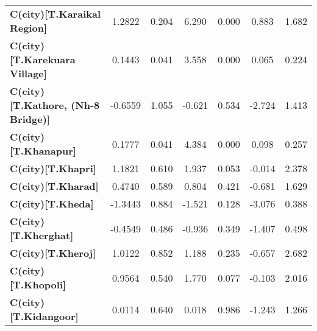 \begin{center}
\begin{tabular}{lcccccc}
\textbf{C(city)[T.Karaikal Region]}                                                                 &       1.2822  &        0.204     &     6.290  &         0.000        &        0.883    &        1.682     \\
\textbf{C(city)[T.Karekuara Village]}                                                               &       0.1443  &        0.041     &     3.558  &         0.000        &        0.065    &        0.224     \\
\textbf{C(city)[T.Kathore, (Nh-8 Bridge)]}                                                          &      -0.6559  &        1.055     &    -0.621  &         0.534        &       -2.724    &        1.413     \\
\textbf{C(city)[T.Khanapur]}                                                                        &       0.1777  &        0.041     &     4.384  &         0.000        &        0.098    &        0.257     \\
\textbf{C(city)[T.Khapri]}                                                                          &       1.1821  &        0.610     &     1.937  &         0.053        &       -0.014    &        2.378     \\
\textbf{C(city)[T.Kharad]}                                                                          &       0.4740  &        0.589     &     0.804  &         0.421        &       -0.681    &        1.629     \\
\textbf{C(city)[T.Kheda]}                                                                           &      -1.3443  &        0.884     &    -1.521  &         0.128        &       -3.076    &        0.388     \\
\textbf{C(city)[T.Kherghat]}                                                                        &      -0.4549  &        0.486     &    -0.936  &         0.349        &       -1.407    &        0.498     \\
\textbf{C(city)[T.Kheroj]}                                                                          &       1.0122  &        0.852     &     1.188  &         0.235        &       -0.657    &        2.682     \\
\textbf{C(city)[T.Khopoli]}                                                                         &       0.9564  &        0.540     &     1.770  &         0.077        &       -0.103    &        2.016     \\
\textbf{C(city)[T.Kidangoor]}                                                                       &       0.0114  &        0.640     &     0.018  &         0.986        &       -1.243    &        1.266     \\

\end{tabular}
\end{center}
